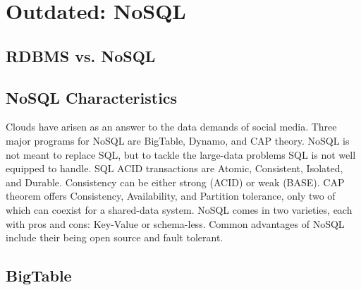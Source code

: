\chapter{Outdated: NoSQL}
\label{sec:icloud-nosql}

\FILENAME


\section{RDBMS vs. NoSQL}




\section{NoSQL Characteristics}

Clouds have arisen as an answer to the data demands of social media.
Three major programs for NoSQL are BigTable, Dynamo, and CAP theory.
NoSQL is not meant to replace SQL, but to tackle the large-data problems
SQL is not well equipped to handle. SQL ACID transactions are Atomic,
Consistent, Isolated, and Durable. Consistency can be either strong
(ACID) or weak (BASE). CAP theorem offers Consistency, Availability, and
Partition tolerance, only two of which can coexist for a shared-data
system. NoSQL comes in two varieties, each with pros and cons: Key-Value
or schema-less. Common advantages of NoSQL include their being open
source and fault tolerant.




\section{BigTable}

